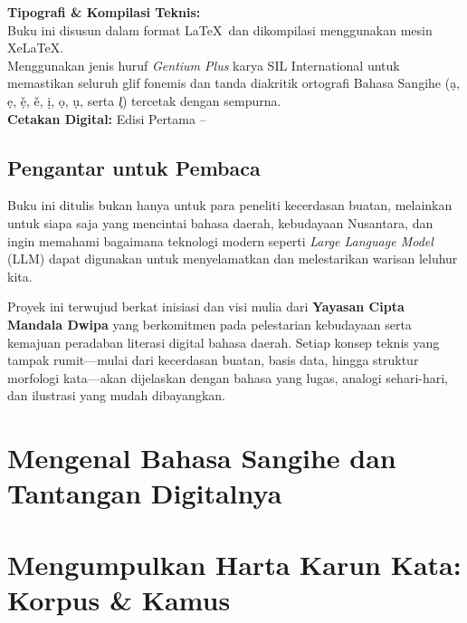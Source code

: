 \documentclass[11pt,twoside,openright]{book}
\begin{document}
\begin{flushleft}
    \textbf{Tipografi \& Kompilasi Teknis:}\\
    Buku ini disusun dalam format \LaTeX\ dan dikompilasi menggunakan mesin Xe\LaTeX.\\
    Menggunakan jenis huruf \textit{Gentium Plus} karya SIL International untuk memastikan seluruh glif fonemis dan tanda diakritik ortografi Bahasa Sangihe (\d{a}, \d{e}, \v{\d{e}}, \v{e}, \d{i}, \d{o}, \d{u}, serta \textit{l᷊}) tercetak dengan sempurna.\\[0.8em]
    
    \textbf{Cetakan Digital:} Edisi Pertama -- \StatLastSyncDate\\
\end{flushleft}
\clearpage

\chapter*{Pengantar untuk Pembaca}
Buku ini ditulis bukan hanya untuk para peneliti kecerdasan buatan, melainkan untuk siapa saja yang mencintai bahasa daerah, kebudayaan Nusantara, dan ingin memahami bagaimana teknologi modern seperti \textit{Large Language Model} (LLM) dapat digunakan untuk menyelamatkan dan melestarikan warisan leluhur kita.

Proyek ini terwujud berkat inisiasi dan visi mulia dari \textbf{Yayasan Cipta Mandala Dwipa} yang berkomitmen pada pelestarian kebudayaan serta kemajuan peradaban literasi digital bahasa daerah. Setiap konsep teknis yang tampak rumit---mulai dari kecerdasan buatan, basis data, hingga struktur morfologi kata---akan dijelaskan dengan bahasa yang lugas, analogi sehari-hari, dan ilustrasi yang mudah dibayangkan.

\tableofcontents

\mainmatter

\part{Mengenal Bahasa Sangihe dan Tantangan Digitalnya}




\part{Mengumpulkan Harta Karun Kata: Korpus \& Kamus}



\end{document}
